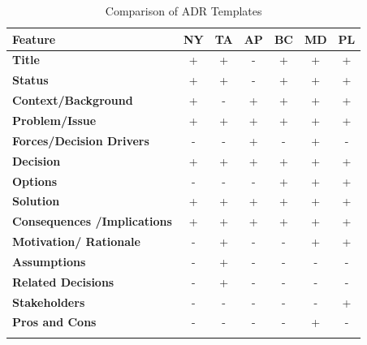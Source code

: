         \newpage
        \begin{longtable}{|m{5cm}|c|c|c|c|c|c|}
            \hline
            \textbf{Feature} & \textbf{NY} & \textbf{TA} & \textbf{AP} & \textbf{BC} & \textbf{MD} & \textbf{PL} \\
            \hline
            \textbf{Title} & + & + & - & + & + & + \\
            \hline
            \textbf{Status} & + & + & - & + & + & + \\
            \hline
            \textbf{Context/Background} & + & - & + & + & + & + \\
            \hline
            \textbf{Problem/Issue} & + & + & + & + & + & + \\
            \hline
            \textbf{Forces/Decision Drivers} & - & - & + & - & + & - \\
            \hline
            \textbf{Decision} & + & + & + & + & + & + \\
            \hline
            \textbf{Options} & - & - & - & + & + & + \\
            \hline
            \textbf{Solution} & + & + & + & + & + & + \\
            \hline
            \textbf{Consequences
            /Implications} & + & + & + & + & + & + \\
            \hline
            \textbf{Motivation/
            Rationale} & - & + & - & - & + & + \\
            \hline
            \textbf{Assumptions} & - & + & - & - & - & - \\
            \hline
            \textbf{Related Decisions} & - & + & - & - & - & - \\
            \hline
            \textbf{Stakeholders} & - & - & - & - & - & + \\
            \hline
            \textbf{Pros and Cons} & - & - & - & - & + & - \\
            \hline
            \caption{Comparison of ADR Templates}
            \label{table:adr_template_comparison}
        \end{longtable}

